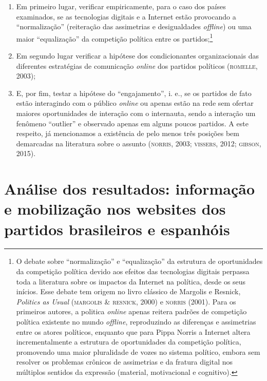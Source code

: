 \begin{enumerate}
\item Em primeiro lugar, verificar empiricamente, para o caso dos países
examinados, se as tecnologias digitais e a Internet estão provocando a
``normalização'' (reiteração das assimetrias e desigualdades \emph{offline})
ou uma maior ``equalização'' da competição política entre os
partidos;\footnote{O debate sobre ``normalização'' e ``equalização'' da
  estrutura de oportunidades da competição política devido aos efeitos
  das tecnologias digitais perpassa toda a literatura sobre os impactos
  da Internet na política, desde os seus inícios. Esse debate tem origem
  no livro clássico de Margolis e Resnick, \emph{Politics as Usual}
  (\textsc{margolis} \& \textsc{resnick}, 2000) e \textsc{norris} (2001). Para os primeiros
  autores, a politica \emph{\emph{online}} apenas reitera padrões de competição
  política existente no mundo \emph{offline}, reproduzindo as diferenças
  e assimetrias entre os atores políticos, enquanto que para Pippa
  Norris a Internet altera incrementalmente a estrutura de oportunidades
  da competição política, promovendo uma maior pluralidade de vozes no
  sistema político, embora sem resolver os problemas crônicos de
  assimetrias e da fratura digital nos múltiplos sentidos da expressão
  (material, motivacional e cognitivo).}

\item Em segundo lugar verificar a hipótese dos condicionantes
organizacionais das diferentes estratégias de comunicação \emph{\emph{online}} dos
partidos políticos (\textsc{romelle}, 2003);

\item E, por fim, testar a hipótese do ``engajamento'', i. e., se os
partidos de fato estão interagindo com o público \emph{\emph{online}} ou apenas estão
na rede sem ofertar maiores oportunidades de interação com o internauta,
sendo a interação um fenômeno ``outlier'' e observado apenas em alguns
poucos partidos. A este respeito, já mencionamos a existência de pelo
menos três posições bem demarcadas na literatura sobre o assunto
(\textsc{norris}, 2003; \textsc{vissers}, 2012; \textsc{gibson}, 2015).
\end{enumerate}

\section{Análise dos resultados: informação e mobilização nos websites dos
partidos brasileiros e espanhóis}

